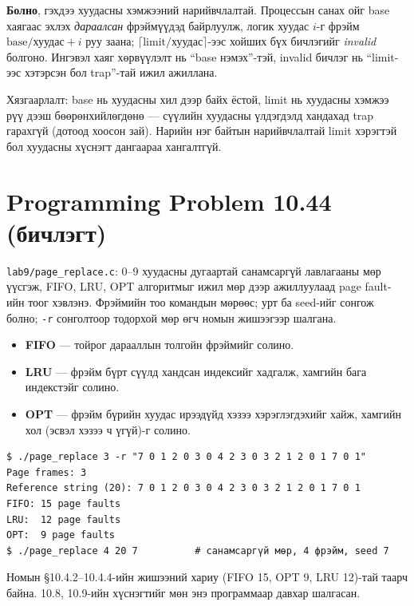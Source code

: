 \documentclass[12pt,a4paper]{article}
\begin{document}
\textbf{Болно}, гэхдээ хуудасны хэмжээний нарийвчлалтай. Процессын санах ойг base хаягаас эхлэх \emph{дараалсан} фрэймүүдэд байрлуулж, логик хуудас $i$-г фрэйм $\text{base}/\text{хуудас} + i$ руу заана; $\lceil \text{limit}/\text{хуудас} \rceil$-ээс хойших бүх бичлэгийг \emph{invalid} болгоно. Ингэвэл хаяг хөрвүүлэлт нь “base нэмэх”-тэй, invalid бичлэг нь “limit-ээс хэтэрсэн бол trap”-тай ижил ажиллана.

Хязгаарлалт: base нь хуудасны хил дээр байх ёстой, limit нь хуудасны хэмжээ рүү дээш бөөрөнхийлөгдөнө — сүүлийн хуудасны үлдэгдэлд хандахад trap гарахгүй (дотоод хоосон зай). Нарийн нэг байтын нарийвчлалтай limit хэрэгтэй бол хуудасны хүснэгт дангаараа хангалтгүй.

\section{Programming Problem 10.44 (бичлэгт)}

\texttt{lab9/page\_replace.c}: 0–9 хуудасны дугаартай санамсаргүй лавлагааны мөр үүсгэж, FIFO, LRU, OPT алгоритмыг ижил мөр дээр ажиллуулаад page fault-ийн тоог хэвлэнэ. Фрэймийн тоо командын мөрөөс; урт ба seed-ийг сонгож болно; \texttt{-r} сонголтоор тодорхой мөр өгч номын жишээгээр шалгана.
\begin{itemize}[leftmargin=1.5em]
  \item \textbf{FIFO} — тойрог дарааллын толгойн фрэймийг солино.
  \item \textbf{LRU} — фрэйм бүрт сүүлд хандсан индексийг хадгалж, хамгийн бага индекстэйг солино.
  \item \textbf{OPT} — фрэйм бүрийн хуудас ирээдүйд хэзээ хэрэглэгдэхийг хайж, хамгийн хол (эсвэл хэзээ ч үгүй)-г солино.
\end{itemize}
\begin{lstlisting}[language={}]
$ ./page_replace 3 -r "7 0 1 2 0 3 0 4 2 3 0 3 2 1 2 0 1 7 0 1"
Page frames: 3
Reference string (20): 7 0 1 2 0 3 0 4 2 3 0 3 2 1 2 0 1 7 0 1
FIFO: 15 page faults
LRU:  12 page faults
OPT:  9 page faults
$ ./page_replace 4 20 7          # санамсаргүй мөр, 4 фрэйм, seed 7
\end{lstlisting}
Номын §10.4.2–10.4.4-ийн жишээний хариу (FIFO 15, OPT 9, LRU 12)-тай таарч байна. 10.8, 10.9-ийн хүснэгтийг мөн энэ программаар давхар шалгасан.
\end{document}
